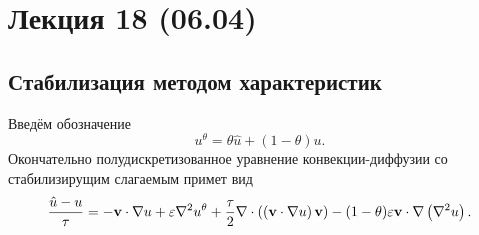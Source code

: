 \section{Лекция 18 (06.04)}

\subsection{Стабилизация методом характеристик}

Введём обозначение
$$
u^\theta = \theta \hat u + \left(1 - \theta\right) u.
$$
Окончательно полудискретизованное уравнение конвекции-диффузии со стабилизирущим слагаемым
примет вид
\begin{equation}
\label{eq:cg_stab_multidim}
\frac{\hat u - u}{\tau} =
-\boldsymbol{\rm v} \cdot \nabla u 
+\varepsilon \nabla^2 u^\theta
+\frac{\tau}{2} \nabla\cdot \left(\left(\boldsymbol{\rm v} \cdot \nabla u\right)\boldsymbol{\rm v}\right)
- (1-\theta)\varepsilon\boldsymbol{\rm v} \cdot \nabla\left(\nabla^2 u\right).
\end{equation}


